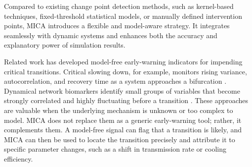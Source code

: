 \documentclass[10pt,letterpaper]{article}
\begin{document}
Compared to existing change point detection methods, such as kernel-based techniques, fixed-threshold statistical models, or manually defined intervention points, MICA introduces a flexible and model-aware strategy. It integrates seamlessly with dynamic systems and enhances both the accuracy and explanatory power of simulation results.

Related work has developed model-free early-warning indicators for impending critical transitions. Critical slowing down, for example, monitors rising variance, autocorrelation, and recovery time as a system approaches a bifurcation \cite{scheffer2009early, scheffer2012anticipating}. Dynamical network biomarkers identify small groups of variables that become strongly correlated and highly fluctuating before a transition \cite{chen2012detecting}. These approaches are valuable when the underlying mechanism is unknown or too complex to model. MICA does not replace them as a generic early-warning tool; rather, it complements them. A model-free signal can flag that a transition is likely, and MICA can then be used to locate the transition precisely and attribute it to specific parameter changes, such as a shift in transmission rate or cooling efficiency.
\end{document}

